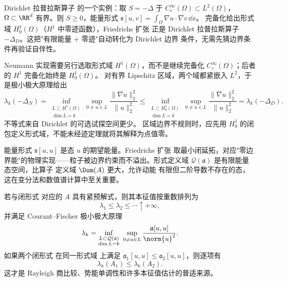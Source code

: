 \begin{example}
Dirichlet 拉普拉斯算子 的一个实例：取 $S=-\Delta$ 于 $C_c^\infty(\Omega)\subset L^2(\Omega)$，
$\Omega\subset\RR^d$ 有界。则 $S\ge0$，能量形式
$\mathfrak s[u,v]=\int_\Omega\nabla u\cdot\overline{\nabla v}\,\dd x$。
完备化给出形式域 $H^1_0(\Omega)$（$H^1$ 中零迹函数），Friedrichs 扩张
正是 Dirichlet 拉普拉斯算子 $-\Delta_D$。这把"有限能量 + 零迹"自动转化为 Dirichlet 边界
条件，无需先猜边界条件再验证自伴性。

Neumann 实现需要另行选取形式域 $H^1(\Omega)$，而不是继续完备化
$C_c^\infty(\Omega)$；后者的 $H^1$ 完备化始终是 $H_0^1(\Omega)$。
对有界 Lipschitz 区域，两个域都紧嵌入 $L^2$，于是极小极大原理给出
\[
\lambda_k(-\Delta_N)
=\inf_{\substack{L\subset H^1(\Omega)\\\dim L=k}}
\sup_{0\ne u\in L}\frac{\|\nabla u\|_2^2}{\|u\|_2^2}
\le\inf_{\substack{L\subset H_0^1(\Omega)\\\dim L=k}}
\sup_{0\ne u\in L}\frac{\|\nabla u\|_2^2}{\|u\|_2^2}
=\lambda_k(-\Delta_D).
\]
不等式来自 Dirichlet 的可选试探空间更少。
区域边界不规则时，应先用 $H_0^1$ 的闭包定义形式域，不能未经迹定理就将其解释为点值零。
\end{example}

能量形式 $\mathfrak s[u,u]$ 是态 $u$ 的期望能量。Friedrichs 扩张
取最小闭延拓，对应"零边界能"的物理实现——粒子被边界约束而不溢出。形式定义域
$\mathcal Q(\mathfrak a)$ 是有限能量态空间，比算子 定义域 $\Dom(A)$ 更大，允许动能
有限但二阶导数不存在的态，这在变分法和数值谱计算中至关重要。

\begin{theorem}[极小极大原理与能级单调性]
若与闭形式 对应的 $A$ 具有紧预解式，则其本征值按重数排列为
\[
 \lambda_1\le\lambda_2\le\cdots\uparrow+\infty,
\]
并满足 Courant--Fischer 极小极大原理
\begin{equation}\label{eq:math-sl-minmax-general}
 \lambda_k
 =\inf_{\substack{L\subset\mathcal Q(\mathfrak a)\\\dim L=k}}
 \ \sup_{0\ne u\in L}
 \frac{\mathfrak a[u,u]}{\norm{u}^2}.
\end{equation}
如果两个闭形式 在同一形式域 上满足
$\mathfrak a_1[u,u]\le\mathfrak a_2[u,u]$，则逐项有
\begin{equation}\label{eq:math-sl-form-monotonicity}
 \lambda_k(A_1)\le\lambda_k(A_2).
\end{equation}
这才是 Rayleigh 商比较、势能单调性和许多本征值估计的普适来源。
\end{theorem}

